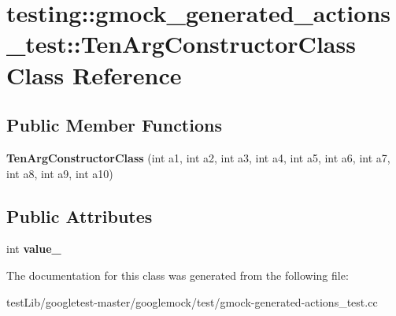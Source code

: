 \hypertarget{classtesting_1_1gmock__generated__actions__test_1_1TenArgConstructorClass}{}\section{testing\+:\+:gmock\+\_\+generated\+\_\+actions\+\_\+test\+:\+:Ten\+Arg\+Constructor\+Class Class Reference}
\label{classtesting_1_1gmock__generated__actions__test_1_1TenArgConstructorClass}
\subsection*{Public Member Functions}
\begin{DoxyCompactItemize}
\item 
\mbox{\label{classtesting_1_1gmock__generated__actions__test_1_1TenArgConstructorClass_ac17a2190151616f986a193dfe0a03cb5}} 
{\bfseries Ten\+Arg\+Constructor\+Class} (int a1, int a2, int a3, int a4, int a5, int a6, int a7, int a8, int a9, int a10)
\end{DoxyCompactItemize}
\subsection*{Public Attributes}
\begin{DoxyCompactItemize}
\item 
\mbox{\label{classtesting_1_1gmock__generated__actions__test_1_1TenArgConstructorClass_ae3c388fd7e3cfbb95196712076a368ad}} 
int {\bfseries value\+\_\+}
\end{DoxyCompactItemize}


The documentation for this class was generated from the following file\+:\begin{DoxyCompactItemize}
\item 
test\+Lib/googletest-\/master/googlemock/test/gmock-\/generated-\/actions\+\_\+test.\+cc\end{DoxyCompactItemize}
